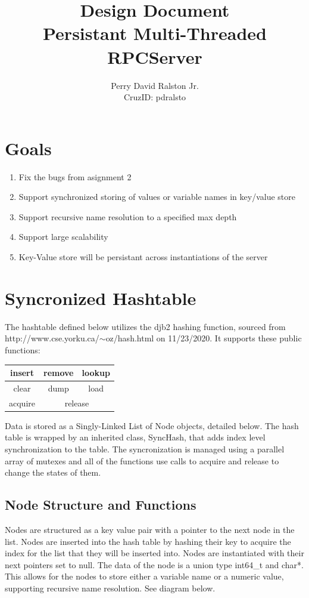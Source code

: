 \documentclass[11pt,letterpaper]{article}
\title{Design Document\\Persistant Multi-Threaded RPCServer}
\author{Perry David Ralston Jr.\\ CruzID: pdralsto}
\begin{document}
\maketitle
\thispagestyle{fancy}
\section{Goals}
\begin{enumerate}
\item Fix the bugs from asignment 2
\item Support synchronized storing of values or variable names in key/value store
\item Support recursive name resolution to a specified max depth
\item Support large scalability
\item Key-Value store will be persistant across instantiations of the server
\end{enumerate}

\section{Syncronized Hashtable}
The hashtable defined below utilizes the djb2 hashing function, sourced from http://www.cse.yorku.ca/$\sim$oz/hash.html on 11/23/2020. It supports these public functions:\\
\begin{tabular}{|c|c|c|}
\hline 
insert & remove & lookup \\ 
\hline 
clear & dump & load \\ 
\hline 
acquire & \multicolumn{2}{c|}{release} \\ 
\hline 
\end{tabular} 

\vspace{.5cm} Data is stored as a Singly-Linked List of Node objects, detailed below. The hash table is wrapped by an inherited class, SyncHash, that adds index level synchronization to the table. The syncronization is managed using a parallel array of mutexes and all of the functions use calls to acquire and release to change the states of them.

\subsection{Node Structure and Functions}

Nodes are structured as a key value pair with a pointer to the next node in the list. Nodes are inserted into the hash table by hashing their key to acquire the index for the list that they will be inserted into. Nodes are instantiated with their next pointers set to null. The data of the node is a union type int64\_t and char*. This allows for the nodes to store either a variable name or a numeric value, supporting recursive name resolution. See diagram below.
\end{document}
